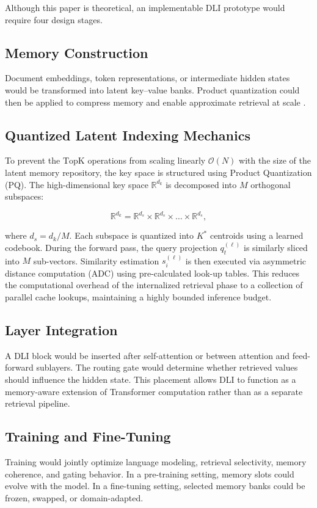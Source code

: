 Although this paper is theoretical, an implementable DLI prototype would require four design stages.

\subsection{Memory Construction}
Document embeddings, token representations, or intermediate hidden states would be transformed into latent key--value banks. Product quantization could then be applied to compress memory and enable approximate retrieval at scale \cite{Jgou2011, Johnson2021}.

\subsection{Quantized Latent Indexing Mechanics}
To prevent the $\text{TopK}$ operations from scaling linearly $\mathcal{O}(N)$ with the size of the latent memory repository, the key space is structured using Product Quantization (PQ). The high-dimensional key space $\mathbb{R}^{d_k}$ is decomposed into $M$ orthogonal subspaces:

\begin{equation}
\mathbb{R}^{d_k} = \mathbb{R}^{d_s} \times \mathbb{R}^{d_s} \times \dots \times \mathbb{R}^{d_s},
\end{equation}

where $d_s = d_k / M$. Each subspace is quantized into $K^*$ centroids using a learned codebook. During the forward pass, the query projection $q_t^{(\ell)}$ is similarly sliced into $M$ sub-vectors. Similarity estimation $s_i^{(\ell)}$ is then executed via asymmetric distance computation (ADC) using pre-calculated look-up tables. This reduces the computational overhead of the internalized retrieval phase to a collection of parallel cache lookups, maintaining a highly bounded inference budget.

\subsection{Layer Integration}
A DLI block would be inserted after self-attention or between attention and feed-forward sublayers. The routing gate would determine whether retrieved values should influence the hidden state. This placement allows DLI to function as a memory-aware extension of Transformer computation rather than as a separate retrieval pipeline.

\subsection{Training and Fine-Tuning}
Training would jointly optimize language modeling, retrieval selectivity, memory coherence, and gating behavior. In a pre-training setting, memory slots could evolve with the model. In a fine-tuning setting, selected memory banks could be frozen, swapped, or domain-adapted.


